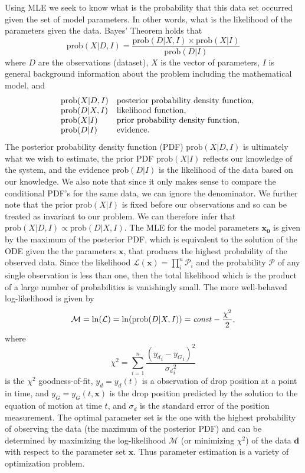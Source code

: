 \documentclass[12pt,a4paper,oneside]{book}
\begin{document}
Using MLE we seek to know what is the probability that this data set occurred given the set of model parameters. In other words, what is the likelihood of the parameters given the data. Bayes' Theorem holds that
\[\mbox{prob}(X|D, I) = \frac{\mbox{prob}(D|X,I) \times \mbox{prob}(X|I)}{\mbox{prob}(D|I)}\]
where $D$ are the observations (dataset), $X$ is the vector of parameters, $I$ is general background information about the problem including the mathematical model, and 
\[\begin{array}{lll}
& \centering \mbox{prob}(X|D, I) & \mbox{posterior probability density function},\\
& \centering \mbox{prob}(D|X, I) & \mbox{likelihood function},\\
& \centering \mbox{prob}(X|I) &  \mbox{prior probability density function},\\
& \centering \mbox{prob}(D|I) &  \mbox{evidence}.
\end{array}
\]
The posterior probability density function (PDF) $\mbox{prob}(X|D, I)$ is ultimately what we wish to estimate, the prior PDF $\mbox{prob}(X|I)$ reflects our knowledge of the system, and the evidence $\mbox{prob}(D|I)$ is the likelihood of the data based on our knowledge. We also note that since it only makes sense to compare the conditional PDF's for the same data, we can ignore the denominator. We further note that the prior $\mbox{prob}(X|I)$ is fixed before our observations and so can be treated as invariant to our problem. We can therefore infer that $\mbox{prob}(X|D, I) \propto \mbox{prob}(D|X, I)$. The MLE for the model parameters $\mathbf{x_0}$ is given by the maximum of the posterior PDF, which is equivalent to the solution of the ODE given the the parameters $\mathbf{x}$, that produces the highest probability of the observed data. Since the likelihood $\mathcal{L}(\mathbf{x}) = \prod_i^n \mathcal{P}_i$ and the probability $\mathcal{P}$ of any single observation is less than one, then the total likelihood which is the product of a large number of probabilities is vanishingly small. The more well-behaved log-likelihood is given by
\[\mathcal{M} = \ln(\mathcal{L}) = \ln(\mbox{prob}(D|X, I)) = \mbox{\emph{const}} - \frac{\chi^2}{2},\]
where 
\[
\chi^2 = \sum^n_{i=1} \frac{\left({y_d}_i - {y_G}_i \right)^2}{{\sigma_d}_i^2}
\]
is the $\chi^2$ goodness-of-fit, $y_d = y_d(t)$ is a observation of drop position at a point in time, and $y_G =  y_G(t, \mathbf{x})$ is the drop position predicted by the solution to the equation of motion at time $t$, and $\sigma_d$ is the standard error of the position measurement. The optimal parameter set is the one with the highest probability of observing the data (the maximum of the posterior PDF) and can be determined by maximizing the log-likelihood $\mathcal{M}$ (or minimizing $\chi^2$) of the data $\mathbf{d}$ with respect to the parameter set $\mathbf{x}$. Thus parameter estimation is a variety of optimization problem.
\end{document}
